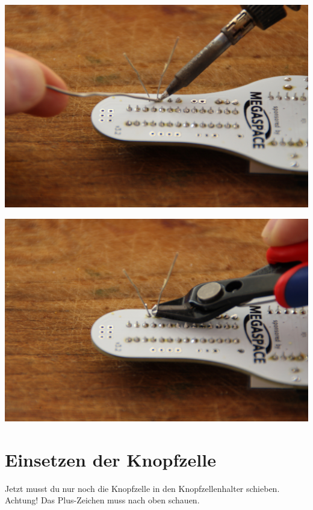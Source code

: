 \documentclass{article}
\begin{document}
\begin{minipage}[b]{0.5\textwidth}
	\includegraphics[width=\textwidth]{Bilder2023/IMG_8384.JPG}
\end{minipage}
\begin{minipage}[b]{0.5\textwidth}
	\includegraphics[width=\textwidth]{Bilder2023/IMG_8385.JPG}
\end{minipage}

\section{Einsetzen der Knopfzelle}

Jetzt musst du nur noch die Knopfzelle in den Knopfzellenhalter schieben.
Achtung! Das Plus-Zeichen muss nach oben schauen.

\vspace{1cm}
\end{document}
